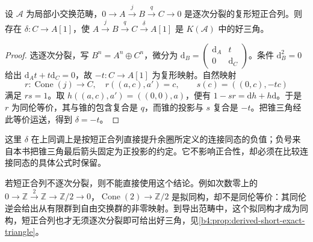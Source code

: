 \begin{proposition}\label{b4:prop:degreewise-split-triangle}
设 \(\mathcal A\) 为局部小交换范畴，\(0\to A\xrightarrow{j}B\xrightarrow{q}C\to0\) 是逐次分裂的复形短正合列。则存在 \(\delta:C\to A[1]\)，使 \(A\xrightarrow{j}B\xrightarrow{q}C\xrightarrow{\delta}A[1]\) 是 \(K(\mathcal A)\) 中的好三角。
\end{proposition}
\begin{proof}
选逐次分裂，写 \(B^n=A^n\oplus C^n\)，微分为
\(\mathrm{d}_B=\left(\begin{smallmatrix}\mathrm{d}_A&t\\0&\mathrm{d}_C\end{smallmatrix}\right)\)。条件 \(\mathrm{d}_B^2=0\) 给出 \(\mathrm{d}_At+t\mathrm{d}_C=0\)，故 \(-t:C\to A[1]\) 为复形映射。自然映射
\[
 r:\operatorname{Cone}(j)\to C,\quad r((a,c),a')=c,
 \qquad s(c)=((0,c),-tc)
\]
满足 \(rs=1\)。取 \(h((a,c),a')=((0,0),a)\)，便有 \(1-sr=\mathrm{d}h+h\mathrm{d}\)。于是 \(r\) 为同伦等价，其与锥的包含复合是 \(q\)，而锥的投影与 \(s\) 复合是 \(-t\)。把锥三角经此等价运送，得到 \(\delta=-t\)。
\end{proof}

这里 \(\delta\) 在上同调上是按短正合列直接提升余圈所定义的连接同态的负值；负号来自本书把锥三角最后箭头固定为正投影的约定。它不影响正合性，却必须在比较连接同态的具体公式时保留。

\ProseParagraphBreak
若短正合列不逐次分裂，则不能直接使用这个结论。例如次数零上的 \(0\to\mathbb Z\xrightarrow{2}\mathbb Z\to\mathbb Z/2\to0\)，\(\operatorname{Cone}(2)\to\mathbb Z/2\) 是拟同构，却不是同伦等价：其同伦逆会给出从有限群到自由交换群的非零映射。到导出范畴中，这个拟同构才成为同构，短正合列也才无须逐次分裂即可给出好三角，见\cref{b4:prop:derived-short-exact-triangle}。
